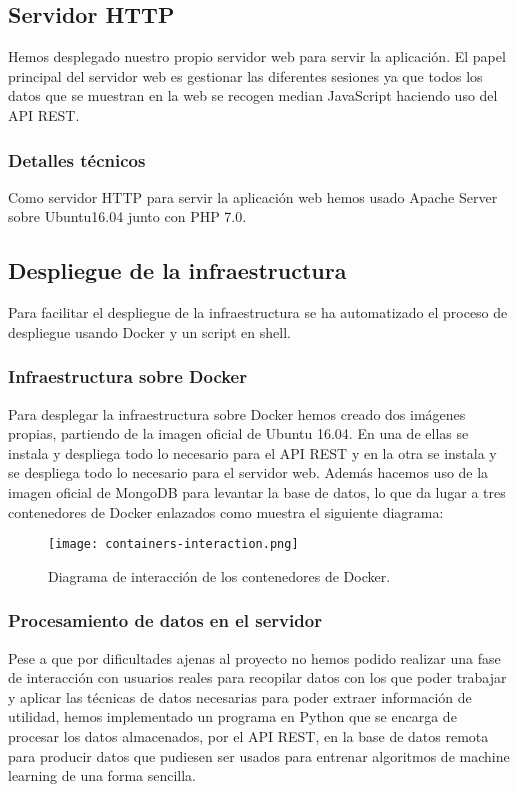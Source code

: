 \documentclass[11pt,spanish]{article}
\begin{document}
\subsection{Servidor HTTP}
Hemos desplegado nuestro propio servidor web para servir la aplicación. El papel principal del servidor web es gestionar las diferentes sesiones ya que todos los datos que se muestran en la web se recogen median JavaScript haciendo uso del API REST. 

\subsubsection{Detalles técnicos}
Como servidor HTTP para servir la aplicación web hemos usado Apache Server sobre Ubuntu16.04 junto con PHP 7.0.

\subsection{Despliegue de la infraestructura}

Para facilitar el despliegue de la infraestructura se ha automatizado el proceso de despliegue usando Docker y un script en shell.

\subsubsection{Infraestructura sobre Docker}
Para desplegar la infraestructura sobre Docker hemos creado dos imágenes propias, partiendo de la imagen oficial de Ubuntu 16.04. En una de ellas se instala y despliega todo lo necesario para el API REST y en la otra se instala y se despliega todo lo necesario para el servidor web. Además hacemos uso de la imagen oficial de MongoDB para levantar la base de datos, lo que da lugar a tres contenedores de Docker enlazados como muestra el siguiente diagrama:

\begin{figure}[H]
  \centering
  \texttt{[image: containers-interaction.png]}
  \caption{Diagrama de interacción de los contenedores de Docker.}
\end{figure}
\newpage

\subsubsection{Procesamiento de datos en el servidor}

Pese a que por dificultades ajenas al proyecto no hemos podido realizar una fase de interacción con usuarios reales para recopilar datos con los que poder trabajar y aplicar las técnicas de datos necesarias para poder extraer información de utilidad, hemos implementado un programa en Python que se encarga de procesar los datos almacenados, por el API REST, en la base de datos remota para producir datos que pudiesen ser usados para entrenar algoritmos de machine learning de una forma sencilla.
\end{document}
